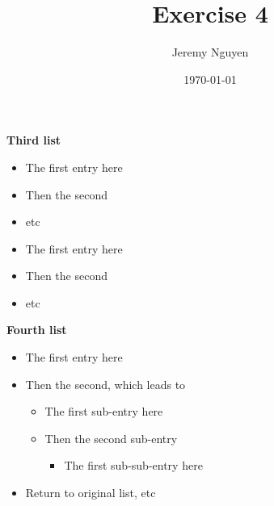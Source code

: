 \documentclass[11pt]{article}
\renewcommand{\labelitemi}{\textgreater}
\begin{document}
\title{Exercise 4}
\author{Jeremy Nguyen}
\date{\today}
\maketitle



\textbf{Third list}
\begin{itemize}
	\item The first entry here
	\item Then the second
	\item etc
\end{itemize}

\renewcommand{\labelitemi}{$\bullet$}
\begin{itemize}
	\item The first entry here
	\item Then the second
	\item etc
\end{itemize}

\textbf{Fourth list}
\begin{itemize}
	\item The first entry here
	\item Then the second, which leads to
	      \begin{itemize}
		      \item The first sub-entry here
		      \item Then the second sub-entry
		            \begin{itemize}
			            \item The first sub-sub-entry here
		            \end{itemize}
	      \end{itemize}
	\item Return to original list, etc
\end{itemize}
\end{document}
